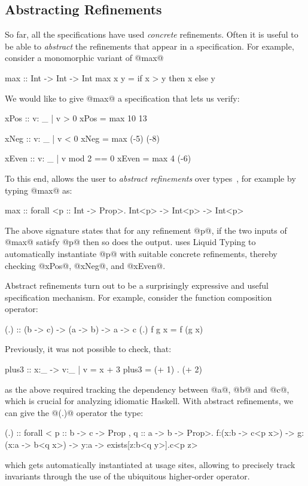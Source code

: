 \subsection{Abstracting Refinements}

So far, all the specifications have used \emph{concrete} refinements. Often it is
useful to be able to \emph{abstract} the refinements that appear in a
specification. For example, consider a monomorphic variant of @max@
%
\begin{code}
  max     :: Int -> Int -> Int 
  max x y = if x > y then x else y
\end{code}
%
We would like to give @max@ a specification that lets us verify:
%
\begin{code}
  xPos  :: {v: _ | v > 0}
  xPos  = max 10 13

  xNeg  :: {v: _ | v < 0}
  xNeg  = max (-5) (-8)

  xEven :: {v: _ | v mod 2 == 0} 
  xEven = max 4 (-6)
\end{code}
%
To this end, \toolname allows the user to \emph{abstract refinements} over
types~\cite{vazou13}, for example by typing @max@ as:
%
\begin{code}
 max :: forall <p :: Int -> Prop>. 
          Int<p> -> Int<p> -> Int<p>
\end{code}
%
The above signature states that for any refinement @p@, if the two
inputs of @max@ satisfy @p@ then so does the output. \toolname uses
Liquid Typing to automatically instantiate @p@ with suitable concrete
refinements, thereby checking @xPos@, @xNeg@, and @xEven@.


Abstract refinements turn out to be a surprisingly expressive and 
useful specification mechanism. For example, consider the function 
composition operator:
%
\begin{code}
  (.) :: (b -> c) -> (a -> b) -> a -> c
  (.) f g x = f (g x)  
\end{code}
%
Previously, it was not possible to check, \eg that:
%
\begin{code}
  plus3 :: x:_ -> {v:_ | v = x + 3}
  plus3 = (+ 1) . (+ 2)
\end{code}
%
as the above required tracking the dependency between @a@, @b@ and @c@,
which is crucial for analyzing idiomatic Haskell.
With abstract refinements, we can give the @(.)@ operator the type:
%
\begin{code}
  (.) :: forall < p :: b -> c -> Prop
                , q :: a -> b -> Prop>.
           f:(x:b -> c<p x>) 
        -> g:(x:a -> b<q x>) 
        -> y:a 
        -> exists[z:b<q y>].c<p z>
\end{code}
%
which gets automatically instantiated at usage sites, allowing \toolname
to precisely track invariants through the use of the ubiquitous 
higher-order operator.

